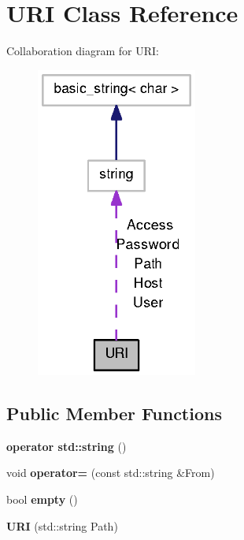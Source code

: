 \section{\-U\-R\-I \-Class \-Reference}
\label{classURI}


\-Collaboration diagram for \-U\-R\-I\-:
\nopagebreak
\begin{figure}[H]
\begin{center}
\leavevmode
\includegraphics[width=150pt]{classURI__coll__graph}
\end{center}
\end{figure}
\subsection*{\-Public \-Member \-Functions}
\begin{DoxyCompactItemize}
\item 
{\bfseries operator std\-::string} ()\label{classURI_aec21c2daaac19676aa46134f63b471c1}

\item 
void {\bfseries operator=} (const std\-::string \&\-From)\label{classURI_ab202884a7e90409fafe98ec04a79d54d}

\item 
bool {\bfseries empty} ()\label{classURI_a3f37b042a1e7cd4bd38fc564de81f0da}

\item 
{\bfseries \-U\-R\-I} (std\-::string \-Path)\label{classURI_a8a36493b5c086fe259de31fedbc856ea}

\end{DoxyCompactItemize}
